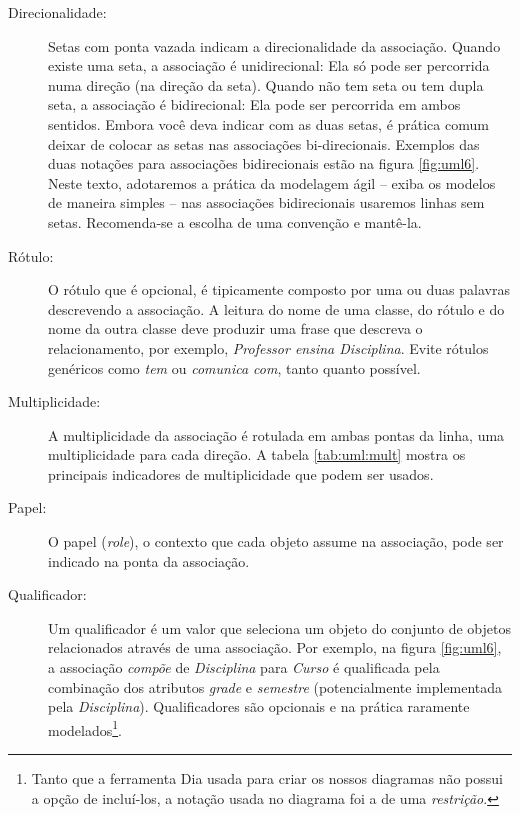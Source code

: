 \documentclass[
	11pt,				%
	openright,
	twoside,			%
	a4paper,			%
	english,			%
	french,
	brazil,				%
	sumario=tradicional
	]{abntex2}
\begin{document}
\begin{description}
\item[Direcionalidade:] Setas com ponta vazada indicam a direcionalidade da associação. Quando existe uma seta, a associação é unidirecional: Ela só pode ser percorrida numa direção (na direção da seta). Quando não tem seta ou tem dupla seta, a associação é bidirecional: Ela pode ser percorrida em ambos sentidos. Embora você deva indicar com as duas setas, é prática comum deixar de colocar as setas nas associações bi-direcionais. Exemplos das duas notações para associações bidirecionais estão na figura \ref{fig:uml6}. Neste texto, adotaremos a prática da modelagem ágil -- exiba os modelos de maneira simples -- nas associações bidirecionais usaremos linhas sem setas. Recomenda-se a escolha de uma convenção e mantê-la.

\item[Rótulo:] O rótulo que é opcional, é tipicamente composto por uma ou duas palavras descrevendo a associação. A leitura do nome de uma classe, do rótulo e do nome da outra classe deve produzir uma frase que descreva o relacionamento, por exemplo, \emph{Professor ensina Disciplina}. Evite rótulos genéricos como \textit{tem} ou \textit{comunica com}, tanto quanto possível.

\item[Multiplicidade:] A multiplicidade da associação é rotulada em ambas pontas da linha, uma multiplicidade para cada direção. A tabela \ref{tab:uml:mult} mostra os principais indicadores de multiplicidade que podem ser usados.

\item[Papel:] O papel (\textit{role}), o contexto que cada objeto assume na associação, pode ser indicado na ponta da associação.

\item[Qualificador:] Um qualificador é um valor que seleciona um objeto do conjunto de objetos relacionados através de uma associação. Por exemplo, na figura \ref{fig:uml6}, a associação \emph{compõe} de \emph{Disciplina} para \emph{Curso} é qualificada pela combinação dos atributos \emph{grade} e \emph{semestre} (potencialmente implementada pela \emph{Disciplina}). Qualificadores são opcionais e na prática raramente modelados\footnote{Tanto que a ferramenta Dia usada para criar os nossos diagramas não possui a opção de incluí-los, a notação usada no diagrama foi a de uma \textit{restrição}.}.

\end{description}
\end{document}
